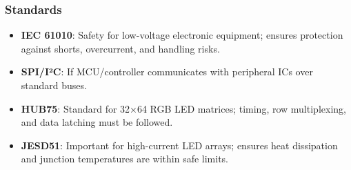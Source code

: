 \subsubsection{Standards}
\begin{itemize}
    \item \textbf{IEC 61010}: Safety for low-voltage electronic equipment; ensures protection against shorts, overcurrent, and handling risks.
    \item \textbf{SPI/I²C}: If MCU/controller communicates with peripheral ICs over standard buses.
    \item \textbf{HUB75}: Standard for 32×64 RGB LED matrices; timing, row multiplexing, and data latching must be followed.
    \item \textbf{JESD51}: Important for high-current LED arrays; ensures heat dissipation and junction temperatures are within safe limits.
\end{itemize}